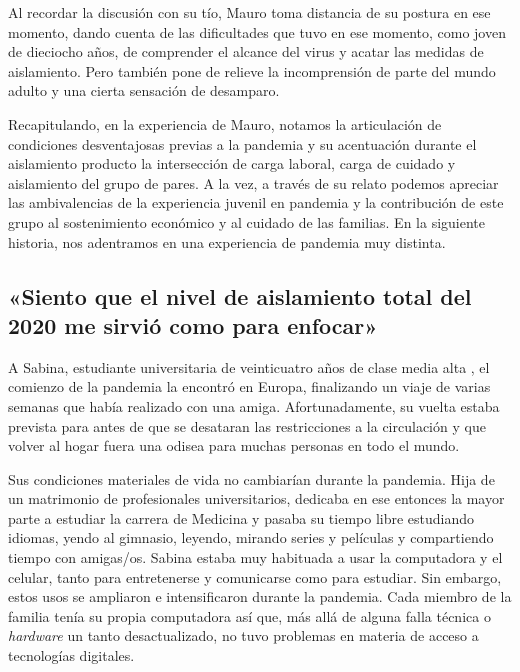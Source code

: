 \begin{refsection}
Al recordar la discusión con su tío, Mauro toma distancia de su postura en ese momento, dando cuenta de las dificultades que tuvo en ese momento, como joven de dieciocho años, de comprender el alcance del virus y acatar las medidas de aislamiento. Pero también pone de relieve la incomprensión de parte del mundo adulto y una cierta sensación de desamparo.

Recapitulando, en la experiencia de Mauro, notamos la articulación de condiciones desventajosas previas a la pandemia y su acentuación durante el aislamiento producto la intersección de carga laboral, carga de cuidado y aislamiento del grupo de pares. A la vez, a través de su relato podemos apreciar las ambivalencias de la experiencia juvenil en pandemia y la contribución de este grupo al sostenimiento económico y al cuidado de las familias. En la siguiente historia, nos adentramos en una experiencia de pandemia muy distinta.


\subsection[«Siento que el nivel de aislamiento total del 2020 me sirvió como para enfocar»]{«Siento que el nivel de aislamiento total del 2020 me sirvió como para enfocar»}
\label{cap-27.siento-que-el-nivel-de-aislamiento-total-del-2020-me-sirvio-como-para-enfocar}
A Sabina, estudiante universitaria de veinticuatro años de clase media alta \protect\parencite{4185-CLEMENCEAU2016}, el comienzo de la pandemia la encontró en Europa, finalizando un viaje de varias semanas que había realizado con una amiga. Afortunadamente, su vuelta estaba prevista para antes de que se desataran las restricciones a la circulación y que volver al hogar fuera una odisea para muchas personas en todo el mundo.

Sus condiciones materiales de vida no cambiarían durante la pandemia. Hija de un matrimonio de profesionales universitarios, dedicaba en ese entonces la mayor parte a estudiar la carrera de Medicina y pasaba su tiempo libre estudiando idiomas, yendo al gimnasio, leyendo, mirando series y películas y compartiendo tiempo con amigas/os. Sabina estaba muy habituada a usar la computadora y el celular, tanto para entretenerse y comunicarse como para estudiar. Sin embargo, estos usos se ampliaron e intensificaron durante la pandemia. Cada miembro de la familia tenía su propia computadora así que, más allá de alguna falla técnica o \emph{hardware} un tanto desactualizado, no tuvo problemas en materia de acceso a tecnologías digitales.


\end{refsection}
